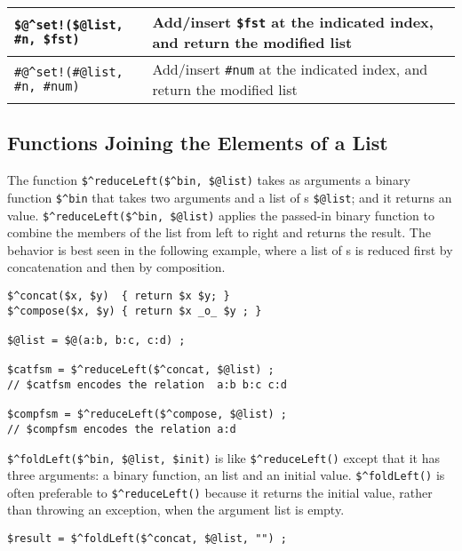 \vspace{.5cm}

\noindent
\begin{tabular}{|l|p{5.5cm}|}
\hline
\verb+$@^set!($@list, #n, $fst)+ & Add/insert \verb!$fst! at the indicated index, and return the
modified list\\
\hline
\verb+#@^set!(#@list, #n, #num)+ & Add/insert \verb!#num! at the indicated index, and return the
modified list\\
\hline
\end{tabular}

\vspace{.5cm}

\subsection{Functions Joining the Elements of a List}

The function 
\verb!$^reduceLeft($^bin, $@list)! takes as arguments a binary function
\verb!$^bin! that takes two \fsm{} arguments and a list of \fsm{}s
\verb!$@list!; and it returns an \fsm{} value.
\verb!$^reduceLeft($^bin, $@list)!  
applies the passed-in binary function to combine the members of
the list from left to right and returns the result.  The behavior is best
seen in the following example, where a list of \fsm{}s is reduced first
by concatenation and then by composition.

\begin{samepage}
\begin{Verbatim}
$^concat($x, $y)  { return $x $y; }
$^compose($x, $y) { return $x _o_ $y ; }

$@list = $@(a:b, b:c, c:d) ;

$catfsm = $^reduceLeft($^concat, $@list) ;
// $catfsm encodes the relation  a:b b:c c:d

$compfsm = $^reduceLeft($^compose, $@list) ;
// $compfsm encodes the relation a:d
\end{Verbatim}
\end{samepage}

\verb!$^foldLeft($^bin, $@list, $init)! is like \verb!$^reduceLeft()! except that it has
three arguments: a binary function, an \fsm{} list and an initial \fsm{} value.
\verb!$^foldLeft()! is often preferable to \verb!$^reduceLeft()! because
it returns the initial value, rather than throwing an exception, when
the argument list is empty.

\begin{Verbatim}
$result = $^foldLeft($^concat, $@list, "") ;
\end{Verbatim}

